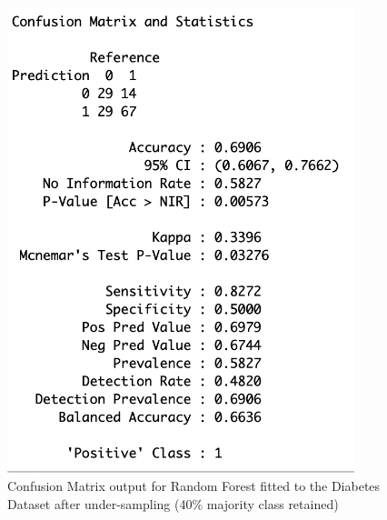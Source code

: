 \begin{figure}[!htbp]
\begin{minipage}{0.45\textwidth}
        \includegraphics[width=0.9\textwidth]{ThesisTemplate/appendix/images/Chapter5Appendix/ConfusionMatrix40/Diabetes.png}
        \caption{Confusion Matrix output for Random Forest fitted to the Diabetes Dataset after under-sampling (40\% majority class retained)}
        \label{fig:my_label}
    \end{minipage}
\end{figure}

